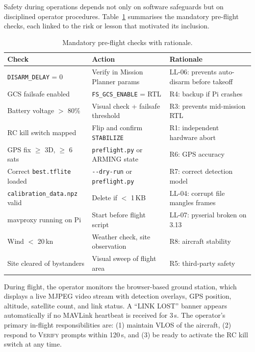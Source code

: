 Safety during operations depends not only on software safeguards but on disciplined operator procedures. Table~\ref{tab:preflight} summarises the mandatory pre-flight checks, each linked to the risk or lesson that motivated its inclusion.

\begin{table}[htbp]
\centering
\caption{Mandatory pre-flight checks with rationale.}
\label{tab:preflight}
\small
\begin{tabular}{p{4.5cm}p{5.0cm}p{2.5cm}}
\toprule
\textbf{Check} & \textbf{Action} & \textbf{Rationale} \\
\midrule
\texttt{DISARM\_DELAY} = 0 & Verify in Mission Planner params & LL-06: prevents auto-disarm before takeoff \\
GCS failsafe enabled & \texttt{FS\_GCS\_ENABLE} = RTL & R4: backup if Pi crashes \\
Battery voltage $>$ 80\% & Visual check + failsafe threshold & R3: prevents mid-mission RTL \\
RC kill switch mapped & Flip and confirm \texttt{STABILIZE} & R1: independent hardware abort \\
GPS fix $\geq$ 3D, $\geq$ 6 sats & \texttt{preflight.py} or ARMING state & R6: GPS accuracy \\
Correct \texttt{best.tflite} loaded & \texttt{-{}-dry-run} or \texttt{preflight.py} & R7: correct detection model \\
\texttt{calibration\_data.npz} valid & Delete if $<$ 1\,KB & LL-04: corrupt file mangles frames \\
mavproxy running on Pi & Start before flight script & LL-07: pyserial broken on 3.13 \\
Wind $<$ 20\,kn & Weather check, site observation & R8: aircraft stability \\
Site cleared of bystanders & Visual sweep of flight area & R5: third-party safety \\
\bottomrule
\end{tabular}
\end{table}

During flight, the operator monitors the browser-based ground station, which displays a live MJPEG video stream with detection overlays, GPS position, altitude, satellite count, and link status. A ``LINK LOST'' banner appears automatically if no MAVLink heartbeat is received for 3\,s. The operator's primary in-flight responsibilities are: (1) maintain VLOS of the aircraft, (2) respond to \textsc{Verify} prompts within 120\,s, and (3) be ready to activate the RC kill switch at any time.

